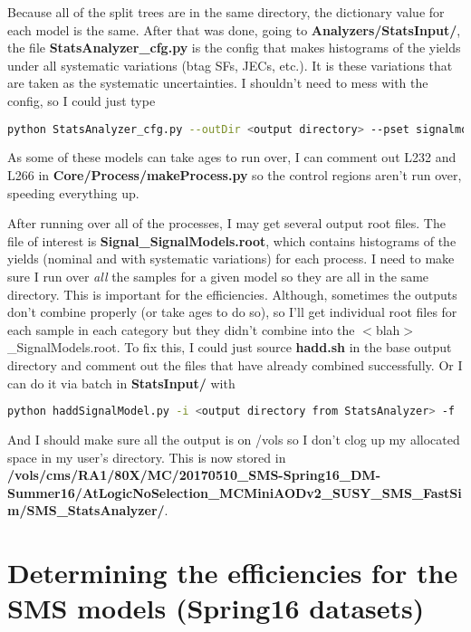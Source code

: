 Because all of the split trees are in the same directory, the dictionary value for each model is the same. After that was done, going to \textbf{Analyzers/StatsInput/}, the file \textbf{StatsAnalyzer\_cfg.py} is the config that makes histograms of the yields under all systematic variations (btag SFs, JECs, etc.). It is these variations that are taken as the systematic uncertainties. I shouldn't need to mess with the config, so I could just type

\begin{lstlisting}[belowskip=-0.7cm, language=sh, numbers=none]
python StatsAnalyzer_cfg.py --outDir <output directory> --pset signalmodel --signalModel SMS_<name of model> --nCores <number of cores to use> --dataMC mc
\end{lstlisting}

As some of these models can take ages to run over, I can comment out L232 and L266 in \textbf{Core/Process/makeProcess.py} so the control regions aren't run over, speeding everything up.

After running over all of the processes, I may get several output root files. The file of interest is \textbf{Signal\_SignalModels.root}, which contains histograms of the yields (nominal and with systematic variations) for each process. I need to make sure I run over \emph{all} the samples for a given model so they are all in the same directory. This is important for the efficiencies. Although, sometimes the outputs don't combine properly (or take ages to do so), so I'll get individual root files for each sample in each category but they didn't combine into the $<$blah$>$\_SignalModels.root. To fix this, I could just source \textbf{hadd.sh} in the base output directory and comment out the files that have already combined successfully. Or I can do it via batch in \textbf{StatsInput/} with

\begin{lstlisting}[belowskip=-0.7cm, language=sh, numbers=none]
python haddSignalModel.py -i <output directory from StatsAnalyzer> -f
\end{lstlisting}

And I should make sure all the output is on /vols so I don't clog up my allocated space in my user's directory. This is now stored in \textbf{/vols/cms/RA1/80X/MC/20170510\_SMS-Spring16\_DM-Summer16/AtLogicNoSelection\_MCMiniAODv2\_SUSY\_SMS\_FastSim/SMS\_StatsAnalyzer/}.


\section{Determining the efficiencies for the SMS models (Spring16 datasets)}

